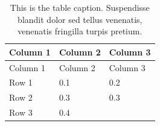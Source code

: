 \documentclass[12pt,a4paperpaper,]{report}
\begin{document}
\begin{longtable}[]{@{}lll@{}}
\caption{This is the table caption. Suspendisse blandit dolor sed tellus
venenatis, venenatis fringilla turpis pretium.
\label{ref_a_table}}\tabularnewline
\toprule
\begin{minipage}[b]{0.25\columnwidth}\raggedright\strut
Column 1
\strut\end{minipage} &
\begin{minipage}[b]{0.30\columnwidth}\raggedright\strut
Column 2
\strut\end{minipage} &
\begin{minipage}[b]{0.24\columnwidth}\raggedright\strut
Column 3
\strut\end{minipage}\tabularnewline
\midrule
\endfirsthead
\toprule
\begin{minipage}[b]{0.25\columnwidth}\raggedright\strut
Column 1
\strut\end{minipage} &
\begin{minipage}[b]{0.30\columnwidth}\raggedright\strut
Column 2
\strut\end{minipage} &
\begin{minipage}[b]{0.24\columnwidth}\raggedright\strut
Column 3
\strut\end{minipage}\tabularnewline
\midrule
\endhead
\begin{minipage}[t]{0.25\columnwidth}\raggedright\strut
Row 1
\strut\end{minipage} &
\begin{minipage}[t]{0.30\columnwidth}\raggedright\strut
0.1
\strut\end{minipage} &
\begin{minipage}[t]{0.24\columnwidth}\raggedright\strut
0.2
\strut\end{minipage}\tabularnewline
\begin{minipage}[t]{0.25\columnwidth}\raggedright\strut
Row 2
\strut\end{minipage} &
\begin{minipage}[t]{0.30\columnwidth}\raggedright\strut
0.3
\strut\end{minipage} &
\begin{minipage}[t]{0.24\columnwidth}\raggedright\strut
0.3
\strut\end{minipage}\tabularnewline
\begin{minipage}[t]{0.25\columnwidth}\raggedright\strut
Row 3
\strut\end{minipage} &
\begin{minipage}[t]{0.30\columnwidth}\raggedright\strut
0.4
\strut\end{minipage} &

\end{longtable}
\end{document}
